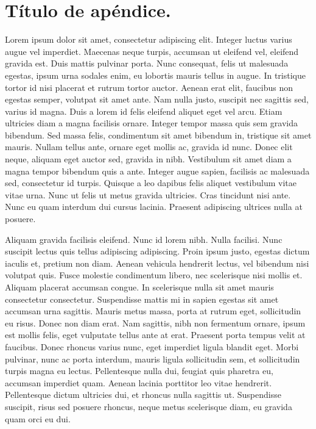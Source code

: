 %
%

\chapter[Título de apéndice]{
	Título de apéndice.
}

Lorem ipsum dolor sit amet, consectetur adipiscing elit. Integer luctus varius augue vel imperdiet. Maecenas neque turpis, accumsan ut eleifend vel, eleifend gravida est. Duis mattis pulvinar porta. Nunc consequat, felis ut malesuada egestas, ipsum urna sodales enim, eu lobortis mauris tellus in augue. In tristique tortor id nisi placerat et rutrum tortor auctor. Aenean erat elit, faucibus non egestas semper, volutpat sit amet ante. Nam nulla justo, suscipit nec sagittis sed, varius id magna. Duis a lorem id felis eleifend aliquet eget vel arcu. Etiam ultricies diam a magna facilisis ornare. Integer tempor massa quis sem gravida bibendum. Sed massa felis, condimentum sit amet bibendum in, tristique sit amet mauris. Nullam tellus ante, ornare eget mollis ac, gravida id nunc. Donec elit neque, aliquam eget auctor sed, gravida in nibh. Vestibulum sit amet diam a magna tempor bibendum quis a ante. Integer augue sapien, facilisis ac malesuada sed, consectetur id turpis. Quisque a leo dapibus felis aliquet vestibulum vitae vitae urna. Nunc ut felis ut metus gravida ultricies. Cras tincidunt nisi ante. Nunc eu quam interdum dui cursus lacinia. Praesent adipiscing ultrices nulla at posuere.

Aliquam gravida facilisis eleifend. Nunc id lorem nibh. Nulla facilisi. Nunc suscipit lectus quis tellus adipiscing adipiscing. Proin ipsum justo, egestas dictum iaculis et, pretium non diam. Aenean vehicula hendrerit lectus, vel bibendum nisi volutpat quis. Fusce molestie condimentum libero, nec scelerisque nisi mollis et. Aliquam placerat accumsan congue. In scelerisque nulla sit amet mauris consectetur consectetur. Suspendisse mattis mi in sapien egestas sit amet accumsan urna sagittis. Mauris metus massa, porta at rutrum eget, sollicitudin eu risus. Donec non diam erat. Nam sagittis, nibh non fermentum ornare, ipsum est mollis felis, eget vulputate tellus ante at erat. Praesent porta tempus velit at faucibus. Donec rhoncus varius nunc, eget imperdiet ligula blandit eget. Morbi pulvinar, nunc ac porta interdum, mauris ligula sollicitudin sem, et sollicitudin turpis magna eu lectus. Pellentesque nulla dui, feugiat quis pharetra eu, accumsan imperdiet quam. Aenean lacinia porttitor leo vitae hendrerit. Pellentesque dictum ultricies dui, et rhoncus nulla sagittis ut. Suspendisse suscipit, risus sed posuere rhoncus, neque metus scelerisque diam, eu gravida quam orci eu dui.

